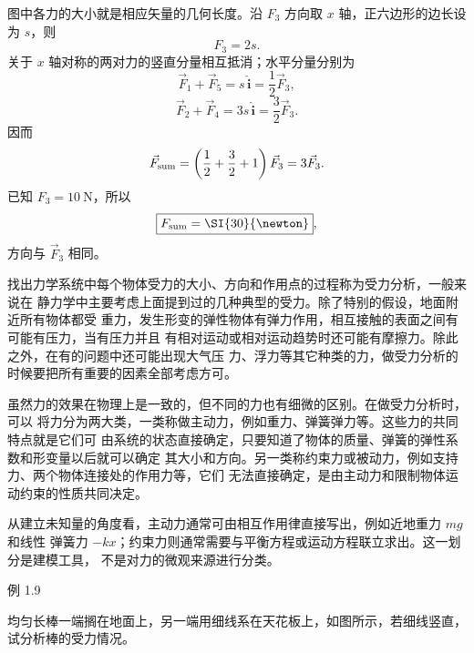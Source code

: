 \documentclass[UTF8,zihao=-4,oneside,openany]{ctexbook}
\newenvironment{xesolution}{%
  \par\smallskip
  \begingroup\small
  \setlength{\abovedisplayskip}{4pt plus 2pt minus 1pt}%
  \setlength{\belowdisplayskip}{4pt plus 2pt minus 1pt}%
  \setlength{\abovedisplayshortskip}{3pt plus 1pt}%
  \setlength{\belowdisplayshortskip}{3pt plus 1pt minus 1pt}%
  \noindent{\bfseries\color{DeepBlue}解答}\quad
}{%
  \par\endgroup\medskip
}
\begin{document}
\begin{xesolution}
图中各力的大小就是相应矢量的几何长度。沿 $F_3$ 方向取 $x$ 轴，正六边形的边长设为 $s$，则
\[
  F_3=2s.
\]
关于 $x$ 轴对称的两对力的竖直分量相互抵消；水平分量分别为
\[
  \vec F_1+\vec F_5=s\,\hat{\boldsymbol i}
  =\frac12\vec F_3,
\]
\[
  \vec F_2+\vec F_4=3s\,\hat{\boldsymbol i}
  =\frac32\vec F_3.
\]
因而
\[
  \vec F_{\rm sum}
  =\left(\frac12+\frac32+1\right)\vec F_3
  =3\vec F_3.
\]
已知 $F_3=\SI{10}{\newton}$，所以
\[
  \boxed{F_{\rm sum}=\SI{30}{\newton}},
\]
方向与 $\vec F_3$ 相同。
\end{xesolution}

找出力学系统中每个物体受力的大小、方向和作用点的过程称为受力分析，一般来说在
静力学中主要考虑上面提到过的几种典型的受力。除了特别的假设，地面附近所有物体都受
重力，发生形变的弹性物体有弹力作用，相互接触的表面之间有可能有压力，当有压力并且
有相对运动或相对运动趋势时还可能有摩擦力。除此之外，在有的问题中还可能出现大气压
力、浮力等其它种类的力，做受力分析的时候要把所有重要的因素全部考虑方可。

虽然力的效果在物理上是一致的，但不同的力也有细微的区别。在做受力分析时，可以
将力分为两大类，一类称做主动力，例如重力、弹簧弹力等。这些力的共同特点就是它们可
由系统的状态直接确定，只要知道了物体的质量、弹簧的弹性系数和形变量以后就可以确定
其大小和方向。另一类称约束力或被动力，例如支持力、两个物体连接处的作用力等，它们
无法直接确定，是由主动力和限制物体运动约束的性质共同决定。

从建立未知量的角度看，主动力通常可由相互作用律直接写出，例如近地重力 $mg$ 和线性
弹簧力 $-kx$；约束力则通常需要与平衡方程或运动方程联立求出。这一划分是建模工具，
不是对力的微观来源进行分类。

\begin{origexamplebox}{例 1.9}
\begin{minipage}[c]{0.62\linewidth}
均匀长棒一端搁在地面上，另一端用细线系在天花板上，如图所示，若细线竖直，
试分析棒的受力情况。
\end{minipage}\hfill
\begin{minipage}[c]{0.34\linewidth}
\centering

\end{minipage}
\end{origexamplebox}
\end{document}
